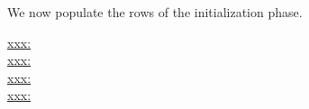 \begin{center}
\end{center}
We now populate the rows of the initialization phase.
\begin{description}
	\item[\underline{\underline{xxx:}}]
	\item[\underline{\underline{xxx:}}]
	\item[\underline{\underline{xxx:}}]
	\item[\underline{\underline{xxx:}}]
\end{description}

